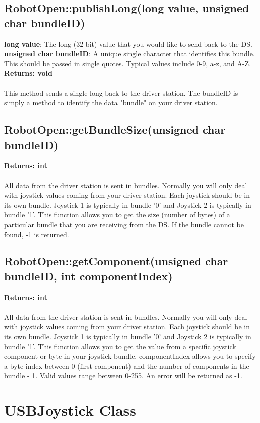 \documentclass[11pt]{article} %
\begin{document}
\subsection{RobotOpen::publishLong(long value, unsigned char bundleID)}
\textbf{long value}: The long (32 bit) value that you would like to send back to the DS.\\
\textbf{unsigned char bundleID}: A unique single character that identifies this bundle. This should be passed in single quotes. Typical values include 0-9, a-z, and A-Z.\\
\textbf{Returns: void}\\\\
This method sends a single long back to the driver station. The bundleID is simply a method to identify the data "bundle" on your driver station.
\subsection{RobotOpen::getBundleSize(unsigned char bundleID)}
\textbf{Returns: int}\\\\
All data from the driver station is sent in bundles. Normally you will only deal with joystick values coming from your driver station. Each joystick should be in its own bundle. Joystick 1 is typically in bundle '0' and Joystick 2 is typically in bundle '1'. This function allows you to get the size (number of bytes) of a particular bundle that you are receiving from the DS. If the bundle cannot be found, -1 is returned.
\subsection{RobotOpen::getComponent(unsigned char bundleID, int componentIndex)}
\textbf{Returns: int}\\\\
All data from the driver station is sent in bundles. Normally you will only deal with joystick values coming from your driver station. Each joystick should be in its own bundle. Joystick 1 is typically in bundle '0' and Joystick 2 is typically in bundle '1'. This function allows you to get the value from a specific joystick component or byte in your joystick bundle. componentIndex allows you to specify a byte index between 0 (first component) and the number of components in the bundle - 1. Valid values range between 0-255. An error will be returned as -1.
\newpage
\section{USBJoystick Class}
\end{document}
